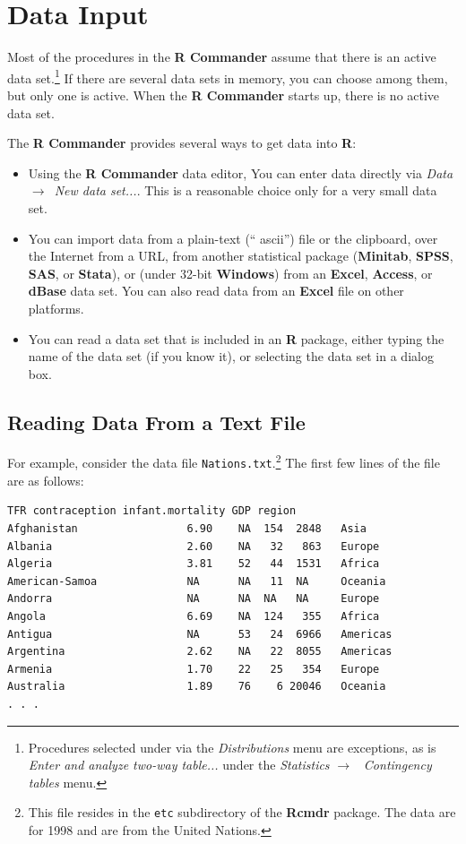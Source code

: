 \documentclass{article}%
\begin{document}
\section{Data Input}

Most of the procedures in the \textbf{R Commander} assume that there is an
active data set.\footnote{Procedures selected under via the
\emph{Distributions} menu are exceptions, as is \emph{Enter and analyze
two-way table...} under the \emph{Statistics }$\longrightarrow$%
\emph{\ Contingency tables} menu.} If there are several data sets in memory,
you can choose among them, but only one is active. When the \textbf{R
Commander} starts up, there is no active data set.

The \textbf{R Commander} provides several ways to get data into \textbf{R}:

\begin{itemize}
\item Using the \textbf{R Commander} data editor, You can enter data directly
via \emph{Data }$\longrightarrow$\emph{\ New data set...}. This is a
reasonable choice only for a very small data set.

\item You can import data from a plain-text (\textquotedblleft
ascii\textquotedblright) file or the clipboard, over the Internet from a URL,
from another statistical package (\textbf{Minitab}, \textbf{SPSS},
\textbf{SAS}, or \textbf{Stata}), or (under 32-bit \textbf{Windows}) from an
\textbf{Excel}, \textbf{Access}, or \textbf{dBase} data set. You can also read
data from an \textbf{Excel} file on other platforms.

\item You can read a data set that is included in an \textbf{R} package,
either typing the name of the data set (if you know it), or selecting the data
set in a dialog box.
\end{itemize}

\subsection{Reading Data From a Text File}

For example, consider the data file \texttt{Nations.txt}.\footnote{This file
resides in the \texttt{etc} subdirectory of the \textbf{Rcmdr} package. The
data are for 1998 and are from the United Nations.} The first few lines of the
file are as follows:
\begin{verbatim}
TFR contraception infant.mortality GDP region
Afghanistan                 6.90    NA  154  2848   Asia
Albania                     2.60    NA   32   863   Europe
Algeria                     3.81    52   44  1531   Africa
American-Samoa              NA      NA   11  NA     Oceania
Andorra                     NA      NA  NA   NA     Europe
Angola                      6.69    NA  124   355   Africa
Antigua                     NA      53   24  6966   Americas
Argentina                   2.62    NA   22  8055   Americas
Armenia                     1.70    22   25   354   Europe
Australia                   1.89    76    6 20046   Oceania
. . .

\end{verbatim}
\end{document}
